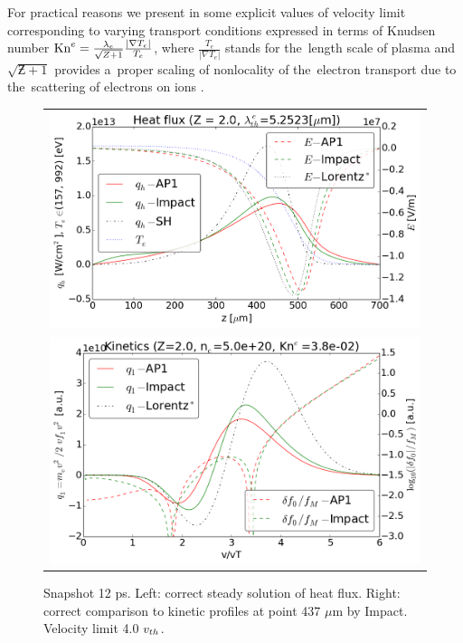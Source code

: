 For practical reasons we present in  
some explicit values of velocity limit corresponding to varying transport 
conditions expressed in terms of Knudsen number 
$\text{Kn}^e = \frac{\lambda_e}{\sqrt{Z + 1}} \frac{|\nabla T_e|}{T_e}$, 
where $\frac{T_e}{|\nabla T_e|}$ stands for the~length scale of plasma and
$\sqrt{\Zbar + 1}$ provides a~proper scaling of nonlocality of the~electron
transport due to the~scattering of electrons on ions \cite{LMV_1983_7}.

\begin{figure}[tbh]
  \begin{center}
    \begin{tabular}{c}
      \includegraphics[width=\figscale\textwidth]{../VFPdata/C7_Impact_case3_heatflux.png} \\
      \includegraphics[width=\figscale\textwidth]{../VFPdata/C7_Impact_case3_kinetics.png}
    \end{tabular}
  \caption{  
  Snapshot 12 ps. Left: correct steady solution of heat flux. 
  Right: correct comparison to kinetic profiles at point 437 $\mu$m by Impact.
  Velocity limit 4.0 $v_{th}$.
  }
  \label{fig:C7_Impact_case3}
  \end{center} 
\end{figure}

